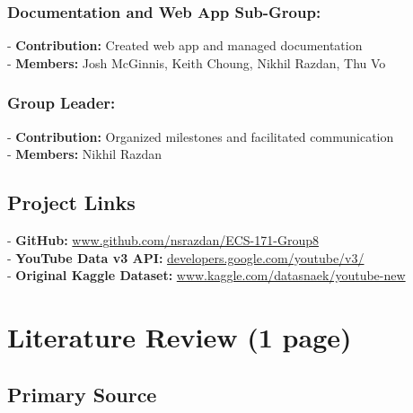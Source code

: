 \documentclass{article}
\begin{document}
\subsubsection*{Documentation and Web App Sub-Group:}
- \textbf{Contribution:} Created web app and managed documentation \\
- \textbf{Members:} Josh McGinnis, Keith Choung, Nikhil Razdan, Thu Vo
\subsubsection*{Group Leader:}
- \textbf{Contribution:} Organized milestones and facilitated communication \\
- \textbf{Members:} Nikhil Razdan

\subsection*{Project Links}
- \textbf{GitHub:} \url{www.github.com/nsrazdan/ECS-171-Group8} \\
- \textbf{YouTube Data v3 API:} \url{developers.google.com/youtube/v3/} \\
- \textbf{Original Kaggle Dataset:} \url{www.kaggle.com/datasnaek/youtube-new} \\

\section*{Literature Review (1 page)}
\subsection*{Primary Source}
\end{document}

